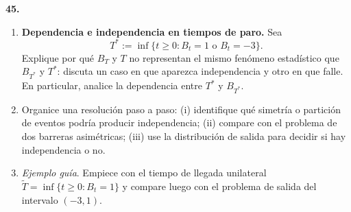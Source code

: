 \documentclass[11pt, letterpaper]{article}
\begin{document}
\newpage

\begin{ejercicio}
    \textbf{45.} 
    \begin{enumerate}
        \item[(a)] \textbf{Dependencia e independencia en tiempos de paro.} Sea
        \[ T^* := \inf\{t \ge 0 : B_t = 1 \text{ o } B_t = -3\}. \]
        Explique por qué $B_T$ y $T$ no representan el mismo fenómeno estadístico que $B_{T^*}$ y $T^*$: discuta un caso en que aparezca independencia y otro en que falle. En particular, analice la dependencia entre $T^*$ y $B_{T^*}$.
        \item[(b)] Organice una resolución paso a paso: (i) identifique qué simetría o partición de eventos podría producir independencia; (ii) compare con el problema de dos barreras asimétricas; (iii) use la distribución de salida para decidir si hay independencia o no.
        \item[(c)] \textit{Ejemplo guía}. Empiece con el tiempo de llegada unilateral $\tilde{T} = \inf\{t \ge 0 : B_t = 1\}$ y compare luego con el problema de salida del intervalo $(-3, 1)$.
    \end{enumerate}
\end{ejercicio}

\vspace{5mm}
\end{document}
